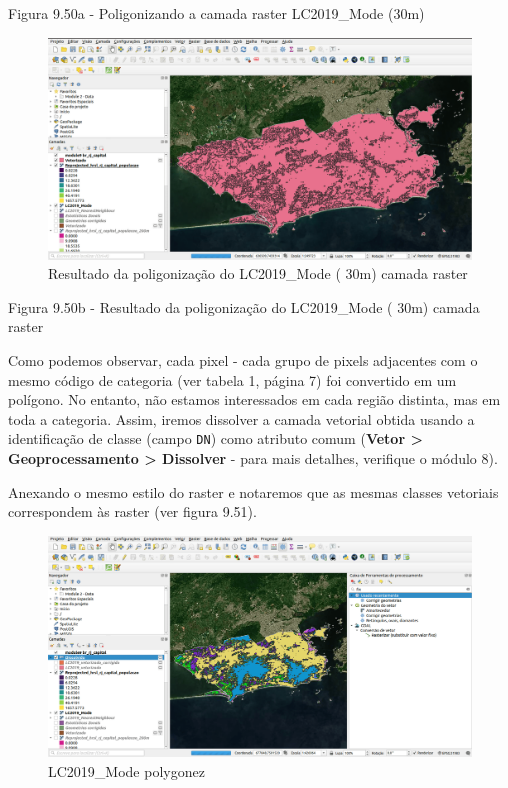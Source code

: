 \documentclass[
]{krantz}
\begin{document}
Figura 9.50a - Poligonizando a camada raster LC2019\_Mode (30m)

\begin{figure}
\centering
\includegraphics{media/modulo9/fig950_b.png}
\caption{Resultado da poligonização do LC2019\_Mode ( 30m) camada raster}
\end{figure}

Figura 9.50b - Resultado da poligonização do LC2019\_Mode ( 30m) camada raster

Como podemos observar, cada pixel - cada grupo de pixels adjacentes com o mesmo código de categoria (ver tabela 1, página 7) foi convertido em um polígono. No entanto, não estamos interessados \hspace{0pt}\hspace{0pt}em cada região distinta, mas em toda a categoria. Assim, iremos dissolver a camada vetorial obtida usando a identificação de classe (campo \texttt{DN}) como atributo comum (\textbf{Vetor \textgreater{} Geoprocessamento \textgreater{} Dissolver} - para mais detalhes, verifique o módulo 8).

Anexando o mesmo estilo do raster e notaremos que as mesmas classes vetoriais correspondem às raster (ver figura 9.51).

\begin{figure}
\centering
\includegraphics{media/modulo9/fig951.png}
\caption{LC2019\_Mode polygonez}
\end{figure}
\end{document}
